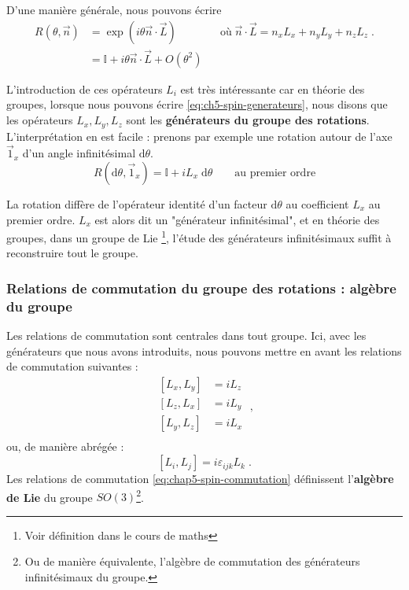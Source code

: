 \documentclass[../notesdecours.tex]{subfiles}
\begin{document}
D'une manière générale, nous pouvons écrire
\begin{align}
    R(\theta, \vec n) &= \exp(i\theta \vec n \cdot \vec L) && \text{où} \; \vec n \cdot \vec L = n_xL_x + n_yL_y + n_zL_z \; . \\
    &= \mathbb{I} + i\theta \vec{n} \cdot \vec L + O(\theta^2) \label{eq:ch5-spin-generateurs}
\end{align}

L'introduction de ces opérateurs $L_i$ est très intéressante car en théorie des groupes, lorsque nous pouvons écrire \ref{eq:ch5-spin-generateurs}, nous disons que les opérateurs $L_x, L_y, L_z$ sont les \textbf{générateurs du groupe des rotations}. L'interprétation en est facile : prenons par exemple une rotation autour de l'axe $\vec 1_x$ d'un angle infinitésimal $\mathrm{d}\theta$.
$$R(\mathrm{d}\theta, \vec 1_x) = \mathbb{I} + iL_x \; \mathrm{d}\theta \qquad \text{au premier ordre}$$

La rotation diffère de l'opérateur identité d'un facteur $\mathrm{d}\theta$ au coefficient $L_x$ au premier ordre. $L_x$ est alors dit un "générateur infinitésimal", et en théorie des groupes, dans un groupe de Lie \footnote{Voir définition dans le cours de maths}, l'étude des générateurs infinitésimaux suffit à reconstruire tout le groupe. 

\subsubsection{Relations de commutation du groupe des rotations : algèbre du groupe}
Les relations de commutation sont centrales dans tout groupe. Ici, avec les générateurs que nous avons introduits, nous pouvons mettre en avant les relations de commutation suivantes :
$$
\begin{array}{ll}
    \left[ L_x, L_y \right] &= iL_z \\
    \left[ L_z, L_x \right] &= iL_y \\
    \left[ L_y, L_z \right] &= iL_x \\
\end{array} \; ,
$$
ou, de manière abrégée :
\begin{equation}\label{eq:chap5-spin-commutation}
    \boxed{\left[ L_i, L_j \right] = i\varepsilon_{ijk} L_k} \; .
\end{equation}
Les relations de commutation \ref{eq:chap5-spin-commutation} définissent l'\textbf{algèbre de Lie} du groupe $SO(3)$\footnote{Ou de manière équivalente, l'algèbre de commutation des générateurs infinitésimaux du groupe.}.
\end{document}
